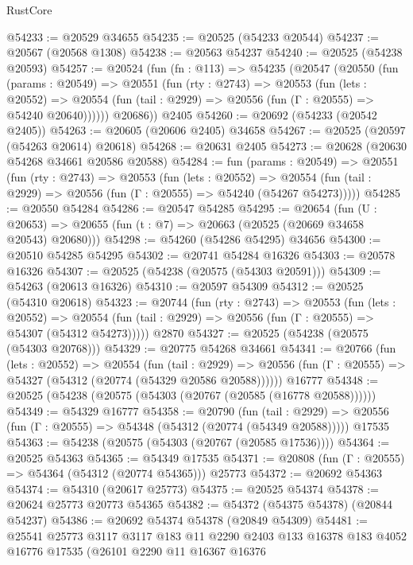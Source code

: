 \begin{lexlean}{RustCore}
\begin{coremodule}
@54233 := @20529 @34655
@54235 := @20525 (@54233 @20544)
@54237 := @20567 (@20568 @1308)
@54238 := @20563 @54237
@54240 := @20525 (@54238 @20593)
@54257 := @20524
    (fun (fn : @113) =>
    @54235
      (@20547
        (@20550
          (fun (params : @20549) =>
          @20551
            (fun (rty : @2743) =>
            @20553
              (fun (lets : @20552) =>
              @20554 (fun (tail : @2929) => @20556 (fun (Γ : @20555) => @54240 @20640))))))
        @20686))
    @2405
@54260 := @20692 (@54233 (@20542 @2405))
@54263 := @20605 (@20606 @2405) @34658
@54267 := @20525 (@20597 (@54263 @20614) @20618)
@54268 := @20631 @2405
@54273 := @20628 (@20630 @54268 @34661 @20586 @20588)
@54284 := fun (params : @20549) =>
  @20551
    (fun (rty : @2743) =>
    @20553
      (fun (lets : @20552) =>
      @20554 (fun (tail : @2929) => @20556 (fun (Γ : @20555) => @54240 (@54267 @54273)))))
@54285 := @20550 @54284
@54286 := @20547 @54285
@54295 := @20654
    (fun (U : @20653) => @20655 (fun (t : @7) => @20663 (@20525 (@20669 @34658 @20543) @20680)))
@54298 := @54260 (@54286 @54295) @34656
@54300 := @20510 @54285 @54295
@54302 := @20741 @54284 @16326
@54303 := @20578 @16326
@54307 := @20525 (@54238 (@20575 (@54303 @20591)))
@54309 := @54263 (@20613 @16326)
@54310 := @20597 @54309
@54312 := @20525 (@54310 @20618)
@54323 := @20744
    (fun (rty : @2743) =>
    @20553
      (fun (lets : @20552) =>
      @20554 (fun (tail : @2929) => @20556 (fun (Γ : @20555) => @54307 (@54312 @54273)))))
    @2870
@54327 := @20525 (@54238 (@20575 (@54303 @20768)))
@54329 := @20775 @54268 @34661
@54341 := @20766
    (fun (lets : @20552) =>
    @20554
      (fun (tail : @2929) =>
      @20556 (fun (Γ : @20555) => @54327 (@54312 (@20774 (@54329 @20586 @20588))))))
    @16777
@54348 := @20525 (@54238 (@20575 (@54303 (@20767 (@20585 (@16778 @20588))))))
@54349 := @54329 @16777
@54358 := @20790
    (fun (tail : @2929) => @20556 (fun (Γ : @20555) => @54348 (@54312 (@20774 (@54349 @20588)))))
    @17535
@54363 := @54238 (@20575 (@54303 (@20767 (@20585 @17536))))
@54364 := @20525 @54363
@54365 := @54349 @17535
@54371 := @20808 (fun (Γ : @20555) => @54364 (@54312 (@20774 @54365))) @25773
@54372 := @20692 @54363
@54374 := @54310 (@20617 @25773)
@54375 := @20525 @54374
@54378 := @20624 @25773 @20773 @54365
@54382 := @54372 (@54375 @54378) (@20844 @54237)
@54386 := @20692 @54374 @54378 (@20849 @54309)
@54481 := @25541
    @25773
    @3117
    @3117
    @183
    @11
    @2290
    @2403
    @133
    @16378
    @183
    @4052
    @16776
    @17535
    (@26101
      @2290
      @11
      @16367
      @16376

\end{coremodule}
\end{lexlean}
